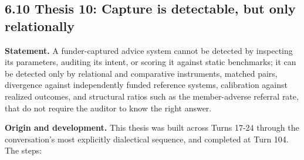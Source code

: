 \documentclass[sigconf,nonacm=true]{acmart}
\begin{document}
\subsection{6.10 Thesis 10: Capture is detectable, but only relationally}

\textbf{Statement.} A funder-captured advice system cannot be detected by inspecting its parameters, auditing its intent, or scoring it against static benchmarks; it can be detected only by relational and comparative instruments,  matched pairs, divergence against independently funded reference systems, calibration against realized outcomes, and structural ratios such as the member-adverse referral rate,  that do not require the auditor to know the right answer.

\textbf{Origin and development.} This thesis was built across Turns 17-24 through the conversation's most explicitly dialectical sequence, and completed at Turn 104. The steps:
\end{document}
